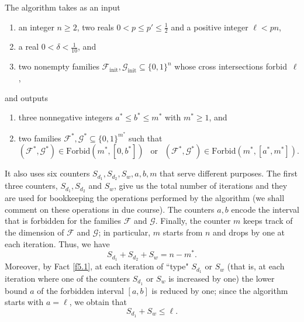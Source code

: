 \documentclass[10pt]{amsart}
\theoremstyle{remark}
\newcommand{\meg}{\geqslant}
\newcommand{\mik}{\leqslant}
\newcommand{\Fcal}{\mathcal{F}}
\newcommand{\Gcal}{\mathcal{G}}
\newcommand{\Forb}[2]{\mathrm{Forbid}\left(#1,#2\right)}
\begin{document}
The algorithm takes as an input
\begin{enumerate}
\item[(I1)] an integer $n\meg 2$, two reals $0<p\mik p'\mik \frac12$ and a positive integer $\ell< pn$,
\item[(I2)] a real $0<\delta<\frac{1}{10}$, and
\item[(I3)] two nonempty families $\Fcal_{\mathrm{init}}, \Gcal_{\mathrm{init}}\subseteq \{0,1\}^n$ whose
cross intersections forbid~$\ell$,
\end{enumerate}
and outputs
\begin{enumerate}
\item[(O1)] three nonnegative integers $a^*\mik b^*\mik m^*$ with $m^*\meg 1$, and
\item[(O2)] two families $\Fcal^*, \Gcal^*\subseteq \{0,1\}^{m^*}$ such that
\begin{equation} \label{e5.4}
(\Fcal^*,\Gcal^*)\in\Forb{m^*}{[0,b^*]} \ \  \text{ or } \ \
(\Fcal^*,\Gcal^*)\in \Forb{m^*}{[a^*,m^*]}.
\end{equation}
\end{enumerate}
It also uses six counters $S_{d_1},S_{d_2},S_w,a,b,m$ that serve different purposes.
The first three counters, $S_{d_1},S_{d_2}$ and $S_w$, give us the total number of iterations
and they are used for bookkeeping the operations performed by the algorithm (we shall comment
on these operations in due course). The counters $a,b$ encode the interval that is forbidden
for the families $\Fcal$ and $\Gcal$. Finally, the counter $m$ keeps track of the dimension of
$\Fcal$ and $\Gcal$; in particular, $m$ starts from $n$ and drops by one at each iteration. Thus, we have
\begin{equation}\label{e5.5}
S_{d_1}+S_{d_2}+S_w=n-m^*.
\end{equation}
Moreover, by Fact \ref{f5.1}, at each iteration of ``type" $S_{d_1}$ or $S_{w}$
(that is, at each iteration where one of the counters $S_{d_1}$ or $S_{w}$ is increased by one)
the lower bound $a$ of the forbidden interval $[a,b]$ is reduced by one; since the algorithm starts
with $a=\ell$, we obtain that
\begin{equation} \label{e5.6}
S_{d_1}+S_w\mik \ell.
\end{equation}
\end{document}
